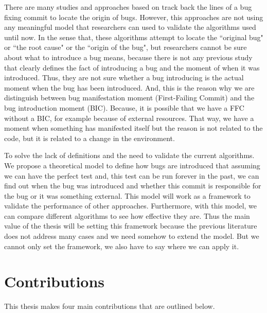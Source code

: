 \documentclass[a4paper, 12pt]{book}
\begin{document}
There are many studies and approaches based on track back the lines of a bug fixing commit to locate the origin of bugs. However, this approaches are not using any meaningful model that researchers can used to validate the algorithms used until now. In the sense that, these algorithms attempt to locate the ``original bug" or ``the root cause" or the ``origin of the bug", but researchers cannot be sure about what to introduce a bug means, because there is not any previous study that clearly defines the fact of introducing a bug and the moment of when it was introduced. Thus, they are not sure whether a bug introducing is the actual moment when the bug has been introduced. And, this is the reason why we are distinguish between bug manifestation moment (First-Failing Commit) and the bug introduction moment (BIC). Because, it is possible that we have a FFC without a BIC, for example because of external resources. That way, we have a moment when something has manifested itself but the reason is not related to the code, but it is related to a change in the environment.

To solve the lack of definitions and the need to validate the current algorithms. We propose a theoretical model to define how bugs are introduced that assuming we can have the perfect test and, this test can be run forever in the past, we can find out when the bug was introduced and whether this commit is responsible for the bug or it was something external. This model will work as a framework to validate the performance of other approaches. Furthermore, with this model, we can compare different algorithms to see how effective they are. Thus the main value of the thesis will be setting this framework because the previous literature does not address many cases and we need somehow to extend the model. But we cannot only set the framework, we also have to say where we can apply it.


\section{Contributions}
\label{subsec:contributions}
This thesis makes four main contributions that are outlined below. %
\end{document}
